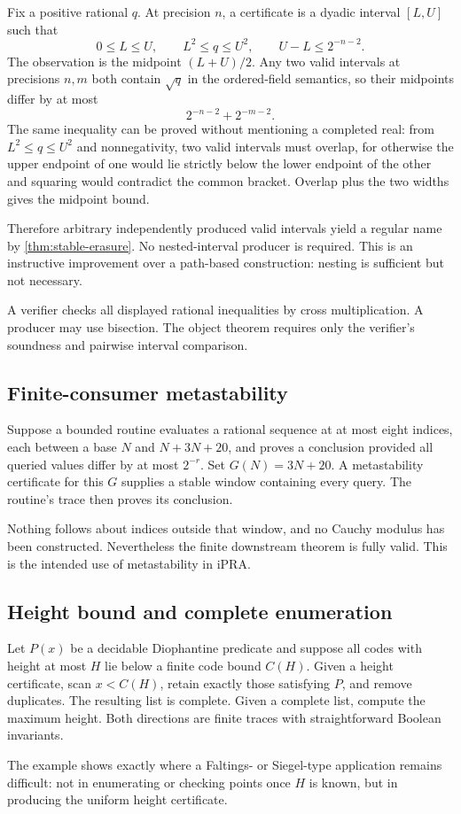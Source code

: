 Fix a positive rational \(q\).  At precision \(n\), a certificate is a dyadic
interval \([L,U]\) such that
\[
 0\le L\le U,
 \qquad L^2\le q\le U^2,
 \qquad U-L\le2^{-n-2}.
\]
The observation is the midpoint \((L+U)/2\).  Any two valid intervals at
precisions \(n,m\) both contain \(\sqrt q\) in the ordered-field semantics, so
their midpoints differ by at most
\[
 2^{-n-2}+2^{-m-2}.
\]
The same inequality can be proved without mentioning a completed real: from
\(L^2\le q\le U^2\) and nonnegativity, two valid intervals must overlap, for
otherwise the upper endpoint of one would lie strictly below the lower endpoint
of the other and squaring would contradict the common bracket.  Overlap plus
the two widths gives the midpoint bound.

Therefore arbitrary independently produced valid intervals yield a regular
name by \cref{thm:stable-erasure}.  No nested-interval producer is required.
This is an instructive improvement over a path-based construction: nesting is
sufficient but not necessary.

A verifier checks all displayed rational inequalities by cross multiplication.
A producer may use bisection.  The object theorem requires only the verifier's
soundness and pairwise interval comparison.

\subsection{Finite-consumer metastability}

Suppose a bounded routine evaluates a rational sequence at at most eight
indices, each between a base \(N\) and \(N+3N+20\), and proves a conclusion
provided all queried values differ by at most \(2^{-r}\).  Set
\(G(N)=3N+20\).  A metastability certificate for this \(G\) supplies a stable
window containing every query.  The routine's trace then proves its conclusion.

Nothing follows about indices outside that window, and no Cauchy modulus has
been constructed.  Nevertheless the finite downstream theorem is fully valid.
This is the intended use of metastability in iPRA.

\subsection{Height bound and complete enumeration}

Let \(P(x)\) be a decidable Diophantine predicate and suppose all codes with
height at most \(H\) lie below a finite code bound \(C(H)\).  Given a height
certificate, scan \(x<C(H)\), retain exactly those satisfying \(P\), and remove
duplicates.  The resulting list is complete.  Given a complete list, compute
the maximum height.  Both directions are finite traces with straightforward
Boolean invariants.

The example shows exactly where a Faltings- or Siegel-type application remains
difficult: not in enumerating or checking points once \(H\) is known, but in
producing the uniform height certificate.
